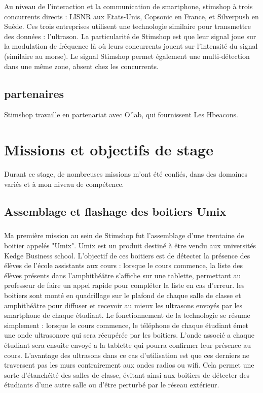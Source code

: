 \documentclass[12pt]{report}
\begin{document}
Au niveau de l'interaction et la communication de smartphone, stimshop à trois concurrents directs : LISNR aux Etats-Unis, Copsonic en France, et Silverpush en Suède. Ces trois entreprises utilisent une technologie similaire pour transmettre des données : l'ultrason. La particularité de Stimshop est que leur signal joue sur la modulation de fréquence là où leurs concurrents jouent sur l'intensité du signal (similaire au morse). Le signal Stimshop permet également une multi-détection dans une même zone, absent chez les concurrents. 

	\section{partenaires}
		
Stimshop travaille en partenariat avec O'lab, qui fournissent Les Hbeacons. 

\chapter{Missions et objectifs de stage}
		
Durant ce stage, de nombreuses missions m'ont été confiés, dans des domaines variés et à mon niveau de compétence. 

	\section{Assemblage et flashage des boitiers Umix}
		
\paragraph{}
Ma première mission au sein de Stimshop fut l'assemblage d'une trentaine de boitier appelés "Umix". Umix est un produit destiné à être vendu aux universités Kedge Business school. L'objectif de ces boitiers est de détecter la présence des élèves de l'école assistants aux cours : lorsque le cours commence, la liste des élèves présents dans l'amphithéâtre s'affiche sur une tablette, permettant au professeur de faire un appel rapide pour compléter la liste en cas d'erreur. les boitiers sont monté en quadrillage sur le plafond de chaque salle de classe et amphithéâtre pour diffuser et recevoir au mieux les ultrasons envoyés par les smartphone de chaque étudiant. Le fonctionnement de la technologie se résume simplement : lorsque le cours commence, le téléphone de chaque étudiant émet une onde ultrasonore qui sera récupérée par les boitiers. L'onde associé a chaque étudiant sera ensuite envoyé a la tablette qui pourra confirmer leur présence au cours. L'avantage des ultrasons dans ce cas d'utilisation est que ces derniers ne traversent pas les murs contrairement aux ondes radios ou wifi. Cela permet une sorte d'étanchéité des salles de classe, évitant ainsi aux boitiers de détecter des étudiants d'une autre salle ou d'être perturbé par le réseau extérieur.  
\end{document}
